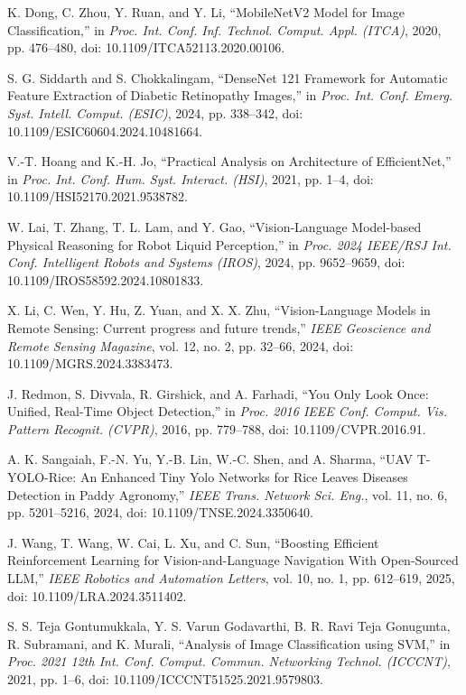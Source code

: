 \documentclass[12pt,a4paper]{report}
\begin{document}
\begin{thebibliography}{23}
	 K. Dong, C. Zhou, Y. Ruan, and Y. Li, ``MobileNetV2 Model for Image Classification,'' in \textit{Proc. Int. Conf. Inf. Technol. Comput. Appl. (ITCA)}, 2020, pp. 476--480, doi: 10.1109/ITCA52113.2020.00106.
	
	 S. G. Siddarth and S. Chokkalingam, ``DenseNet 121 Framework for Automatic Feature Extraction of Diabetic Retinopathy Images,'' in \textit{Proc. Int. Conf. Emerg. Syst. Intell. Comput. (ESIC)}, 2024, pp. 338--342, doi: 10.1109/ESIC60604.2024.10481664.
	
	 V.-T. Hoang and K.-H. Jo, ``Practical Analysis on Architecture of EfficientNet,'' in \textit{Proc. Int. Conf. Hum. Syst. Interact. (HSI)}, 2021, pp. 1--4, doi: 10.1109/HSI52170.2021.9538782.
	
	 W. Lai, T. Zhang, T. L. Lam, and Y. Gao, ``Vision-Language Model-based Physical Reasoning for Robot Liquid Perception,'' in \textit{Proc. 2024 IEEE/RSJ Int. Conf. Intelligent Robots and Systems (IROS)}, 2024, pp. 9652--9659, doi: 10.1109/IROS58592.2024.10801833.
	
	 X. Li, C. Wen, Y. Hu, Z. Yuan, and X. X. Zhu, ``Vision-Language Models in Remote Sensing: Current progress and future trends,'' \textit{IEEE Geoscience and Remote Sensing Magazine}, vol. 12, no. 2, pp. 32--66, 2024, doi: 10.1109/MGRS.2024.3383473.
	
	 J. Redmon, S. Divvala, R. Girshick, and A. Farhadi, ``You Only Look Once: Unified, Real-Time Object Detection,'' in \textit{Proc. 2016 IEEE Conf. Comput. Vis. Pattern Recognit. (CVPR)}, 2016, pp. 779--788, doi: 10.1109/CVPR.2016.91.
	
	 A. K. Sangaiah, F.-N. Yu, Y.-B. Lin, W.-C. Shen, and A. Sharma, ``UAV T-YOLO-Rice: An Enhanced Tiny Yolo Networks for Rice Leaves Diseases Detection in Paddy Agronomy,'' \textit{IEEE Trans. Network Sci. Eng.}, vol. 11, no. 6, pp. 5201--5216, 2024, doi: 10.1109/TNSE.2024.3350640.
	
	 J. Wang, T. Wang, W. Cai, L. Xu, and C. Sun, ``Boosting Efficient Reinforcement Learning for Vision-and-Language Navigation With Open-Sourced LLM,'' \textit{IEEE Robotics and Automation Letters}, vol. 10, no. 1, pp. 612--619, 2025, doi: 10.1109/LRA.2024.3511402.
	
	 S. S. Teja Gontumukkala, Y. S. Varun Godavarthi, B. R. Ravi Teja Gonugunta, R. Subramani, and K. Murali, ``Analysis of Image Classification using SVM,'' in \textit{Proc. 2021 12th Int. Conf. Comput. Commun. Networking Technol. (ICCCNT)}, 2021, pp. 1--6, doi: 10.1109/ICCCNT51525.2021.9579803.
	

\end{thebibliography}
\end{document}
